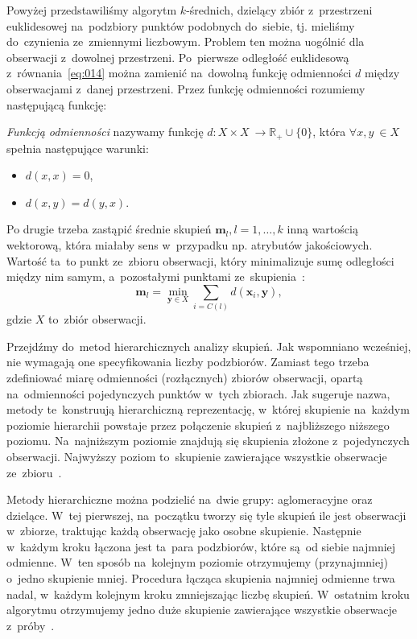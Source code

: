 \documentclass{praca1}
\begin{document}
Powyżej przedstawiliśmy algorytm $k$-średnich, dzielący zbiór z~przestrzeni euklidesowej na~podzbiory punktów podobnych do~siebie, tj. mieliśmy do~czynienia ze~zmiennymi liczbowym. Problem ten można uogólnić dla obserwacji z~dowolnej przestrzeni. Po~pierwsze odległość euklidesową z~równania~\eqref{eq:014} można zamienić na~dowolną funkcję odmienności $d$ między obserwacjami z~danej przestrzeni. Przez funkcję odmienności rozumiemy następującą funkcję:

\begin{definition}
\emph{Funkcją odmienności} nazywamy funkcję $d: X\times X~\rightarrow \mathbb{R}_+\cup\{0\}$, która \hbox{$\forall x, y~\in X$} spełnia następujące warunki:
\begin{itemize}
\item $d(x,x) = 0$,
\item $d(x,y) = d(y,x)$.
\end{itemize}
\end{definition}

Po drugie trzeba zastąpić średnie skupień $\mathbf{m}_l, l=1,\ldots,k$ inną wartością wektorową, która miałaby sens w~przypadku np. atrybutów jakościowych. Wartość ta~to punkt ze~zbioru obserwacji, który minimalizuje sumę odległości między nim samym, a~pozostałymi punktami ze~skupienia~\cite{Koronacki2005:statystyczne}:
\begin{equation}
\mathbf{m}_l = \min\limits_{\mathbf{y} \in X} \sum\limits_{i = C(l)} d(\mathbf{x}_i, \mathbf{y}),
\end{equation}
gdzie $X$ to~zbiór obserwacji.

Przejdźmy do~metod hierarchicznych analizy skupień. Jak wspomniano wcześniej, nie wymagają one specyfikowania liczby podzbiorów. Zamiast tego trzeba zdefiniować miarę odmienności (rozłącznych) zbiorów obserwacji, opartą na~odmienności pojedynczych punktów w~tych zbiorach. Jak sugeruje nazwa, metody te~konstruują hierarchiczną reprezentację, w~której skupienie na~każdym poziomie hierarchii powstaje przez połączenie skupień z~najbliższego niższego poziomu. Na~najniższym poziomie znajdują się skupienia złożone z~pojedynczych obserwacji. Najwyższy poziom to~skupienie zawierające wszystkie obserwacje ze~zbioru~\cite{Hastie2009:elements}.

Metody hierarchiczne można podzielić na~dwie grupy: aglomeracyjne oraz dzielące. W~tej pierwszej, na~początku tworzy się tyle skupień ile jest obserwacji w~zbiorze, traktując każdą obserwację jako osobne skupienie. Następnie w~każdym kroku łączona jest ta~para podzbiorów, które są~od siebie najmniej odmienne. W~ten sposób na~kolejnym poziomie otrzymujemy (przynajmniej) o~jedno skupienie mniej. Procedura łącząca skupienia najmniej odmienne trwa nadal, w~każdym kolejnym kroku zmniejszając liczbę skupień. W~ostatnim kroku algorytmu otrzymujemy jedno duże skupienie zawierające wszystkie obserwacje z~próby~\cite{Hastie2009:elements, Koronacki2005:statystyczne}.
\end{document}

